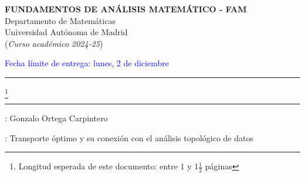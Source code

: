 \documentclass[11pt,a4paper,draft]{article}
\newcommand{\blue}{\textcolor{blue}}
\begin{document}
\begin{center}{\bf FUNDAMENTOS DE ANÁLISIS MATEMÁTICO - FAM}  \\
Departamento de Matemáticas\\
Universidad Autónoma de Madrid\\
({\it Curso académico 2024-25})
\end{center}
\hfill \blue{\small Fecha límite de entrega: lunes, 2 de diciembre}
\vskip 6pt \hrule

\vskip 3mm
 \footnote{Longitud esperada de este documento:  entre 1 y 1$\frac 12$ páginas }
\vskip 3mm \hrule

\vskip 5mm

: Gonzalo Ortega Carpintero

\vskip 5mm

: Transporte óptimo y su conexión con el análisis topológico de datos



\vskip 1cm
\end{document}
